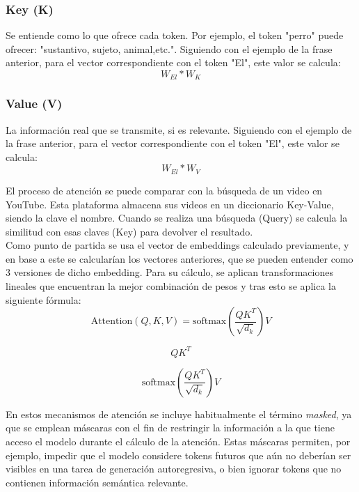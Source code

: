 \documentclass[11pt]{book}
\theoremstyle{plain}
\theoremstyle{definition}
\begin{document}
\subsubsection{Key (K)}
Se entiende como lo que ofrece cada token. Por ejemplo, el token "perro" puede ofrecer: "sustantivo, sujeto, animal,etc.". Siguiendo con el ejemplo de la frase anterior, para el vector correspondiente con el token "El", este valor se calcula: \[W_{El} * W_{K}\]

\subsubsection{Value (V)}
La información real que se transmite, si es relevante. Siguiendo con el ejemplo de la frase anterior, para el vector correspondiente con el token "El", este valor se calcula: \[W_{El} * W_{V}\]

El proceso de atención se puede comparar con la búsqueda de un video en YouTube. Esta plataforma almacena sus videos en un diccionario Key-Value, siendo la clave el nombre. Cuando se realiza una búsqueda (Query) se calcula la similitud con esas claves (Key) para devolver el resultado. \\
Como punto de partida se usa el vector de embeddings calculado previamente, y en base a este se calcularían los vectores anteriores, que se pueden entender como 3 versiones de dicho embedding. Para su cálculo, se aplican transformaciones lineales que encuentran la mejor combinación de pesos y tras esto se aplica la siguiente fórmula:
\[
\text{Attention}(Q, K, V) = \text{softmax}\!\left(\frac{QK^{T}}{\sqrt{d_k}}\right)V
\]

\[
QK^{T}
\]
\noindent{}

\[
\mathrm{softmax}\!\left(\frac{QK^{T}}{\sqrt{d_k}}\right)V
\]
\noindent{}

En estos mecanismos de atención se incluye habitualmente el término \textit{masked}, ya que se emplean máscaras con el fin de restringir la información a la que tiene acceso el modelo durante el cálculo de la atención. Estas máscaras permiten, por ejemplo, impedir que el modelo considere tokens futuros que aún no deberían ser visibles en una tarea de generación autoregresiva, o bien ignorar tokens que no contienen información semántica relevante. 
\end{document}
